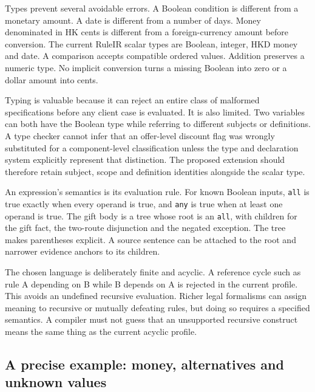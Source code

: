 \documentclass[12pt,a4paper,oneside,openany]{book}
\begin{document}
Types prevent several avoidable errors. A Boolean condition is different from
a monetary amount. A date is different from a number of days. Money denominated
in HK cents is different from a foreign-currency amount before conversion.
The current RuleIR scalar types are Boolean, integer, HKD money and date. A
comparison accepts compatible ordered values. Addition preserves a numeric
type. No implicit conversion turns a missing Boolean into zero or a dollar
amount into cents.

Typing is valuable because it can reject an entire class of malformed
specifications before any client case is evaluated. It is also limited. Two
variables can both have the Boolean type while referring to different subjects
or definitions. A type checker cannot infer that an offer-level discount flag
was wrongly substituted for a component-level classification unless the type
and declaration system explicitly represent that distinction. The proposed
extension should therefore retain subject, scope and definition identities
alongside the scalar type.

An expression's semantics is its evaluation rule. For known Boolean inputs,
\texttt{all} is true exactly when every operand is true, and \texttt{any} is true
when at least one operand is true. The gift body is a tree whose root is an
\texttt{all}, with children for the gift fact, the two-route disjunction and
the negated exception. The tree makes parentheses explicit. A source sentence
can be attached to the root and narrower evidence anchors to its children.

The chosen language is deliberately finite and acyclic. A reference cycle such
as rule A depending on B while B depends on A is rejected in the current
profile. This avoids an undefined recursive evaluation. Richer legal formalisms
can assign meaning to recursive or mutually defeating rules, but doing so
requires a specified semantics. A compiler must not guess that an unsupported
recursive construct means the same thing as the current acyclic profile.

\subsection{A precise example: money, alternatives and unknown values}
\label{merge:P-03-product:03}

\label{sec:semantics}
\end{document}

